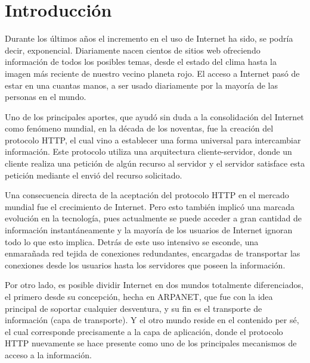 
\chapter{Introducción} %

\label{ch:introduction} %

Durante los últimos años el incremento en el uso de Internet ha sido, se podría decir, exponencial. Diariamente nacen cientos de sitios web ofreciendo información de todos los posibles temas, desde el estado del clima hasta la imagen más reciente de nuestro vecino planeta rojo. El acceso a Internet pasó de estar en una cuantas manos, a ser usado diariamente por la mayoría de las personas en el mundo.

Uno de los principales aportes, que ayudó sin duda a la consolidación del Internet como fenómeno mundial, en la década de los noventas, fue la creación del protocolo HTTP, el cual vino a establecer una forma universal para intercambiar información. Este protocolo utiliza una arquitectura cliente-servidor, donde un cliente realiza una petición de algún recurso al servidor y el servidor satisface esta petición mediante el envió del recurso solicitado. 

Una consecuencia directa de la aceptación del protocolo HTTP en el mercado mundial fue el crecimiento de Internet. Pero esto también implicó una marcada evolución en la tecnología, pues actualmente se puede acceder a gran cantidad de información instantáneamente y la mayoría de los usuarios de Internet ignoran todo lo que esto implica. Detrás de este uso intensivo se esconde, una enmarañada red tejida de conexiones redundantes, encargadas de transportar las conexiones desde los usuarios hasta los servidores que poseen la información. 

Por otro lado, es posible dividir Internet en dos mundos totalmente diferenciados, el primero desde su concepción, hecha en ARPANET, que fue con la idea principal de soportar cualquier desventura, y su fin es el transporte de información (capa de transporte). Y el otro mundo reside en el contenido per sé, el cual corresponde precisamente a la capa de aplicación, donde el protocolo HTTP nuevamente se hace presente como uno de los principales mecanismos de acceso a la información.

